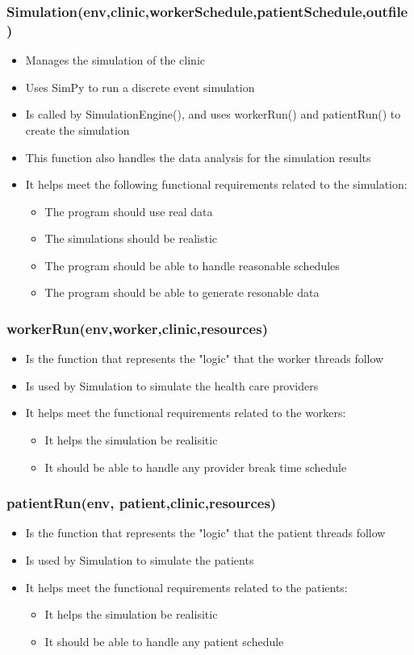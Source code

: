 \documentclass[12pt]{article}
\begin{document}
\subsubsection{Simulation(env,clinic,workerSchedule,patientSchedule,outfile)}
\begin{itemize}
	\item Manages the simulation of the clinic
	\item Uses SimPy to run a discrete event simulation
	\item Is called by SimulationEngine(), and uses workerRun() and patientRun() to create the simulation
	\item This function also handles the data analysis for the simulation results
	\item It helps meet the following functional requirements related to the simulation:
	\begin{itemize}
		\item The program should use real data
		\item The simulations should be realistic
		\item The program should be able to handle reasonable schedules
		\item The program should be able to generate resonable data
	\end{itemize}
\end{itemize}
\subsubsection{workerRun(env,worker,clinic,resources)}
\begin{itemize}
	\item Is the function that represents the "logic" that the worker threads follow
	\item Is used by Simulation to simulate the health care providers
	\item It helps meet the functional requirements related to the workers:
	\begin{itemize}
		\item It helps the simulation be realisitic
		\item It should be able to handle any provider break time schedule
	\end{itemize}
\end{itemize}
\subsubsection{patientRun(env, patient,clinic,resources)}
\begin{itemize}
	\item Is the function that represents the "logic" that the patient threads follow
	\item Is used by Simulation to simulate the patients
	\item It helps meet the functional requirements related to the patients:
	\begin{itemize}
		\item It helps the simulation be realisitic
		\item It should be able to handle any patient schedule
	\end{itemize}
\end{itemize}
\end{document}
